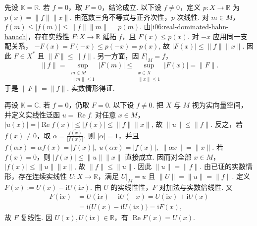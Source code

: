 \begin{FAProof}
先设 \(\displaystyle \mathbb K=\mathbb R\). 若 \(\displaystyle f=0\)，取 \(\displaystyle F=0\)，结论成立. 以下设 \(\displaystyle f\neq0\)，定义 \(\displaystyle p:X\to\mathbb R\) 为 \(\displaystyle p(x)=\|f\|\|x\|\). 由范数三角不等式与正齐次性，\(\displaystyle p\) 次线性. 对 \(\displaystyle m\in M\)， \(\displaystyle f(m)\leqslant|f(m)|\leqslant\|f\|\|m\|=p(m)\).
由\autoref{i06:real-dominated-hahn-banach}，存在实线性 \(\displaystyle F:X\to\mathbb R\) 延拓 \(\displaystyle f\)，且 \(\displaystyle F(x)\leqslant p(x)\). 对 \(\displaystyle -x\) 应用同一支配关系， \(\displaystyle -F(x)=F(-x)\leqslant p(-x)=p(x)\),
故 \(\displaystyle |F(x)|\leqslant\|f\|\|x\|\).
因此 \(\displaystyle F\in X^*\) 且 \(\displaystyle \|F\|\leqslant\|f\|\). 另一方面，因 \(\displaystyle F|_M=f\)，
\[
\|f\|
=\sup_{\substack{m\in M\\ \|m\|\leqslant1}}|F(m)|
\leqslant
\sup_{\substack{x\in X\\ \|x\|\leqslant1}}|F(x)|
=\|F\|.
\]
于是 \(\displaystyle \|F\|=\|f\|\). 实数情形得证.

再设 \(\displaystyle \mathbb K=\mathbb C\). 若 \(\displaystyle f=0\)，仍取 \(\displaystyle F=0\). 以下设 \(\displaystyle f\neq0\). 把 \(\displaystyle X\) 与 \(\displaystyle M\) 视为实向量空间，并定义实线性泛函 \(\displaystyle u=\operatorname{Re}f\). 对任意 \(\displaystyle x\in M\)， \(\displaystyle |u(x)|=|\operatorname{Re}f(x)|\leqslant|f(x)|\leqslant\|f\|\|x\|\),
故 \(\displaystyle \|u\|\leqslant\|f\|\). 反之，若 \(\displaystyle f(x)\neq0\)，取 \(\displaystyle \alpha =\frac{\overline{f(x)}}{|f(x)|}\).
则 \(\displaystyle |\alpha|=1\)，并且 \(\displaystyle f(\alpha x)=\alpha f(x)=|f(x)|, \; u(\alpha x)=|f(x)|, \; \|\alpha x\|=\|x\|\).
若 \(\displaystyle f(x)=0\)，则 \(\displaystyle |f(x)|\leqslant\|u\|\|x\|\) 直接成立. 因而对全部 \(\displaystyle x\in M\)， \(\displaystyle |f(x)|\leqslant\|u\|\|x\|\),
故 \(\displaystyle \|f\|\leqslant\|u\|\). 因此 \(\displaystyle \|u\|=\|f\|\).
由已证的实数情形，存在连续实线性 \(\displaystyle U:X\to\mathbb R\)，满足 \(\displaystyle U|_M=u\) 且 \(\displaystyle \|U\|=\|u\|=\|f\|\).
定义 \(\displaystyle F(x):=U(x)-\mathrm{i}U(\mathrm{i}x)\).
由 \(\displaystyle U\) 的实线性性，\(\displaystyle F\) 对加法与实数倍线性. 又
\[
\begin{aligned}
F(\mathrm{i}x)
&=U(\mathrm{i}x)-\mathrm{i}U(-x)=U(\mathrm{i}x)+\mathrm{i}U(x)\\
&=\mathrm{i}\bigl(U(x)-\mathrm{i}U(\mathrm{i}x)\bigr)=\mathrm{i}F(x),
\end{aligned}
\]
故 \(\displaystyle F\) 复线性. 因 \(\displaystyle U(x),U(\mathrm{i}x)\in\mathbb R\)，有 \(\displaystyle \operatorname{Re}F(x)=U(x)\).


\end{FAProof}
